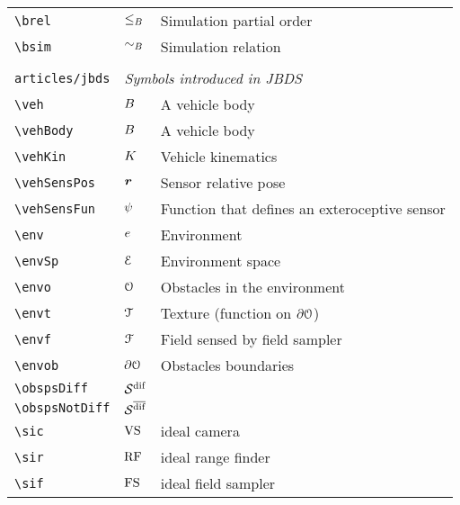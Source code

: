 \begin{longtable}{lll}
 {\color[rgb]{0.5,0.5,0.5}\texttt{\textbackslash brel}} & $\leq_{B}$ &  Simulation partial order\\ 
 {\color[rgb]{0.5,0.5,0.5}\texttt{\textbackslash bsim}} & $\sim_{B}$ &  Simulation relation\\ 
  &  & \\ 
 {\color[rgb]{0.5,0.5,0.5}\texttt{articles/jbds}} & \multicolumn{2}{l}{\emph{Symbols introduced in JBDS}}\\ 
 \hline
{\color[rgb]{0.5,0.5,0.5}\texttt{\textbackslash veh}} & $B$ &  A vehicle body\\ 
 {\color[rgb]{0.5,0.5,0.5}\texttt{\textbackslash vehBody}} & $B$ &  A vehicle body\\ 
 {\color[rgb]{0.5,0.5,0.5}\texttt{\textbackslash vehKin}} & $K$ &  Vehicle kinematics \\ 
 {\color[rgb]{0.5,0.5,0.5}\texttt{\textbackslash vehSensPos}} & $\boldsymbol{r}$ &  Sensor relative pose\\ 
 {\color[rgb]{0.5,0.5,0.5}\texttt{\textbackslash vehSensFun}} & $\psi$ &  Function that defines an exteroceptive sensor\\ 
 {\color[rgb]{0.5,0.5,0.5}\texttt{\textbackslash env}} & $e$ &  Environment\\ 
 {\color[rgb]{0.5,0.5,0.5}\texttt{\textbackslash envSp}} & $\mathcal{E}$ &  Environment space\\ 
 {\color[rgb]{0.5,0.5,0.5}\texttt{\textbackslash envo}} & $\mathcal{O}$ &  Obstacles in the environment\\ 
 {\color[rgb]{0.5,0.5,0.5}\texttt{\textbackslash envt}} & $\mathcal{T}$ &  Texture (function on $\partial \mathcal{O}$)\\ 
 {\color[rgb]{0.5,0.5,0.5}\texttt{\textbackslash envf}} & $\mathcal{F}$ &  Field sensed by field sampler\\ 
 {\color[rgb]{0.5,0.5,0.5}\texttt{\textbackslash envob}} & $\partial \mathcal{O}$ &  Obstacles boundaries\\ 
 {\color[rgb]{0.5,0.5,0.5}\texttt{\textbackslash obspsDiff}} & $\obspsDiff$ & \\ 
 {\color[rgb]{0.5,0.5,0.5}\texttt{\textbackslash obspsNotDiff}} & $\obspsNotDiff$ & \\ 
 {\color[rgb]{0.5,0.5,0.5}\texttt{\textbackslash sic}} & $\text{VS}$ &  ideal camera\\ 
 {\color[rgb]{0.5,0.5,0.5}\texttt{\textbackslash sir}} & $\text{RF}$ &  ideal range finder\\ 
 {\color[rgb]{0.5,0.5,0.5}\texttt{\textbackslash sif}} & $\text{FS}$ &  ideal field sampler\\ 

\end{longtable}
